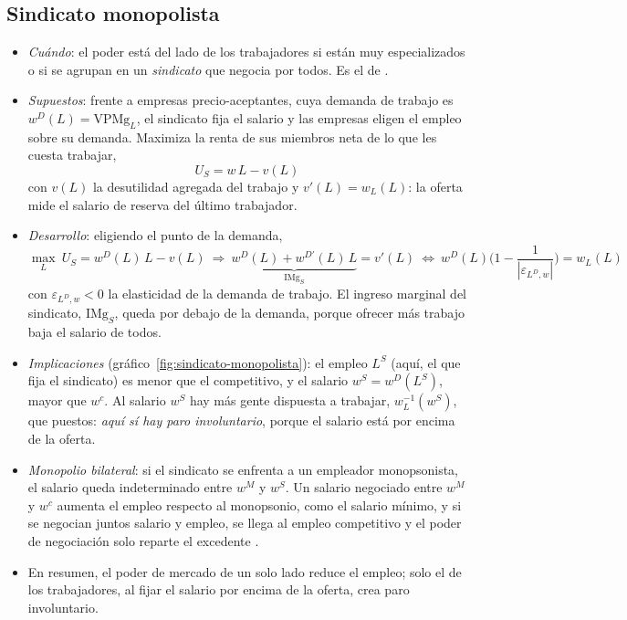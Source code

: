 \documentclass[11pt]{article}
\begin{document}
\subsection{Sindicato monopolista}\label{anexo:sindicato}

\begin{itemize}
\item \emph{Cuándo}: el poder está del lado de los trabajadores si están muy especializados o si se agrupan en un \emph{sindicato} que negocia por todos. Es el  de \textcite{Dunlop1944Wage}.
\item \emph{Supuestos}: frente a empresas precio-aceptantes, cuya demanda de trabajo es $w^D(L)=\mathrm{VPMg}_L$, el sindicato fija el salario y las empresas eligen el empleo sobre su demanda. Maximiza la renta de sus miembros neta de lo que les cuesta trabajar,
  \[
  U_S=w\,L-v(L)
  \]
  con $v(L)$ la desutilidad agregada del trabajo y $v'(L)=w_L(L)$: la oferta mide el salario de reserva del último trabajador.
\item \emph{Desarrollo}: eligiendo el punto de la demanda,
  \[
  \max_{L}\ U_S=w^D(L)\,L-v(L)\ \Longrightarrow\ \underbrace{w^D(L)+w^{D\prime}(L)\,L}_{\mathrm{IMg}_S}=v'(L)\ \Longleftrightarrow\ w^D(L)\Big(1-\frac{1}{|\varepsilon_{L^D,w}|}\Big)=w_L(L)
  \]
  con $\varepsilon_{L^D,w}<0$ la elasticidad de la demanda de trabajo. El ingreso marginal del sindicato, $\mathrm{IMg}_S$, queda por debajo de la demanda, porque ofrecer más trabajo baja el salario de todos.
\item \emph{Implicaciones} (gráfico~\ref{fig:sindicato-monopolista}): el empleo $L^S$ (aquí, el que fija el sindicato) es menor que el competitivo, y el salario $w^S=w^D(L^S)$, mayor que $w^c$. Al salario $w^S$ hay más gente dispuesta a trabajar, $w_L^{-1}(w^S)$, que puestos: \emph{aquí sí hay paro involuntario}, porque el salario está por encima de la oferta.
\item \emph{Monopolio bilateral}: si el sindicato se enfrenta a un empleador monopsonista, el salario queda indeterminado entre $w^M$ y $w^S$\nocite{Bowley1928Bilateral}. Un salario negociado entre $w^M$ y $w^c$ aumenta el empleo respecto al monopsonio, como el salario mínimo, y si se negocian juntos salario y empleo, se llega al empleo competitivo y el poder de negociación solo reparte el excedente  .
\item En resumen, el poder de mercado de un solo lado reduce el empleo; solo el de los trabajadores, al fijar el salario por encima de la oferta, crea paro involuntario.
\end{itemize}
\end{document}
